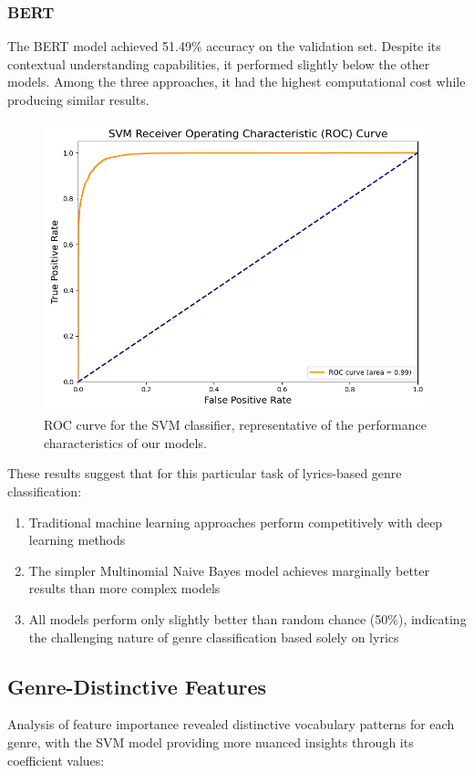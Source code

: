 \documentclass[conference]{IEEEtran}
\begin{document}
\subsubsection{BERT}
The BERT model achieved 51.49\% accuracy on the validation set. Despite its contextual understanding capabilities, it performed slightly below the other models. Among the three approaches, it had the highest computational cost while producing similar results.

\begin{figure}[htbp]
\centerline{\includegraphics[width=0.9\columnwidth]{plots/svm_roc_curve.png}}
\caption{ROC curve for the SVM classifier, representative of the performance characteristics of our models.}
\label{fig:svm_roc}
\end{figure}

These results suggest that for this particular task of lyrics-based genre classification:
\begin{enumerate}
\item Traditional machine learning approaches perform competitively with deep learning methods
\item The simpler Multinomial Naive Bayes model achieves marginally better results than more complex models
\item All models perform only slightly better than random chance (50\%), indicating the challenging nature of genre classification based solely on lyrics
\end{enumerate}

\subsection{Genre-Distinctive Features}
Analysis of feature importance revealed distinctive vocabulary patterns for each genre, with the SVM model providing more nuanced insights through its coefficient values:
\end{document}

